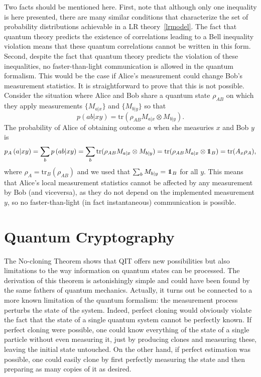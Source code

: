 \documentclass[a4paper]{article}
\def\tr{\mbox{tr}}
\def\one{\leavevmode\hbox{\small1\normalsize\kern-.33em1}}
\begin{document}
Two facts should be mentioned here. First, note that although only
one inequality is here presented, there are many similar
conditions that characterize the set of probability distributions
achievable in a LR theory~\eqref{lrmodel}. The fact
that quantum theory predicts the existence of correlations leading to a Bell inequality violation means that these quantum correlations cannot be written in this form.
Second, despite the fact that quantum theory predicts the violation of these
inequalities, no faster-than-light communication is allowed in the
quantum formalism. This would be the case if Alice's measurement
could change Bob's measurement statistics. It is straightforward
to prove that this is not possible. Consider the situation where
Alice and Bob share a quantum state $\rho_{AB}$ on which they
apply measurements $\{M_{a|x}\}$ and $\{M_{b|y}\}$ so that
\begin{equation}
\label{qcorr}
p(ab|xy)=\tr(\rho_{AB}M_{a|x}\otimes M_{b|y}) .
\end{equation}
The probability of Alice of obtaining outcome $a$ when she measuries $x$ and Bob $y$ is
\begin{equation}
    p_A\,(a|xy)=\sum_b p\,(ab|xy)=\sum_b\tr(\rho_{AB}M_{a|x}\otimes M_{b|y})
    =\tr(\rho_{AB}M_{a|x}\otimes \one_B) =\tr(A_x\rho_A) ,
\end{equation}
where $\rho_A=\tr_B(\rho_{AB})$ and we used that $\sum_b
M_{b|y}=\one_B$ for all $y$. This means that Alice's local measurement statistics
cannot be affected by any measurement by Bob (and viceversa), as they do not depend on the implemented measurement $y$, so
no faster-than-light (in fact instantaneous) communication is possible.


\section{Quantum Cryptography}

The No-cloning Theorem shows that QIT offers new possibilities but
also limitations to the way information on quantum states can be
processed. The derivation of this theorem is astonishingly simple
and could have been found by the same fathers of quantum
mechanics. Actually, it turns out be connected to a more known
limitation of the quantum formalism: the measurement process
perturbs the state of the system. Indeed, perfect cloning would
obviously violate the fact that the state of a single quantum
system cannot be perfectly known. If perfect cloning were
possible, one could know everything of the state of a single
particle without even measuring it, just by producing clones and
measuring these, leaving the initial state untouched. On the other hand, if perfect estimation was possible, 
one could easily clone by first perfectly measuring the state and then preparing as many copies of it as desired.
\end{document}
